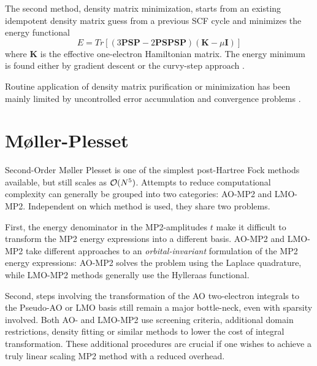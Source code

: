The second method, density matrix minimization, starts from an existing idempotent density matrix guess from a previous SCF cycle and minimizes the energy functional \cite{Li1993,Daw1993,Nun1994}
\begin{equation}
E = Tr\left[ \left(3\mathbf{PSP} - 2\mathbf{PSPSP}\right)\left(\mathbf{K} - \mu \mathbf{I}\right) \right]
\end{equation}
\noindent where $\mathbf{K}$ is the effective one-electron Hamiltonian matrix. The energy minimum is found either by gradient descent or the curvy-step approach \cite{Hel2000,Sha2003}.

Routine application of density matrix purification or minimization has been mainly limited by uncontrolled error accumulation and convergence problems \cite{Rub2008}.


\section{M{\o}ller-Plesset}

Second-Order M{\o}ller Plesset is one of the simplest post-Hartree Fock methods available, but still scales as $\mathcal{O}(N^{5})$. Attempts to reduce computational complexity can generally be grouped into two categories: AO-MP2 and LMO-MP2. Independent on which method is used, they share two problems. 

First, the energy denominator in the MP2-amplitudes $t$ make it difficult to transform the MP2 energy expressions into a different basis. AO-MP2 and LMO-MP2 take different approaches to an \emph{orbital-invariant} formulation of the MP2 energy expressions: AO-MP2 solves the problem using the Laplace quadrature, while LMO-MP2 methods generally use the Hylleraas functional. %

Second, steps involving the transformation of the AO two-electron integrals to the Pseudo-AO or LMO basis still remain a major bottle-neck, even with sparsity involved. Both AO- and LMO-MP2 use screening criteria, additional domain restrictions, density fitting or similar methods to lower the cost of integral transformation. These additional procedures are crucial if one wishes to achieve a truly linear scaling MP2 method with a reduced overhead. 

